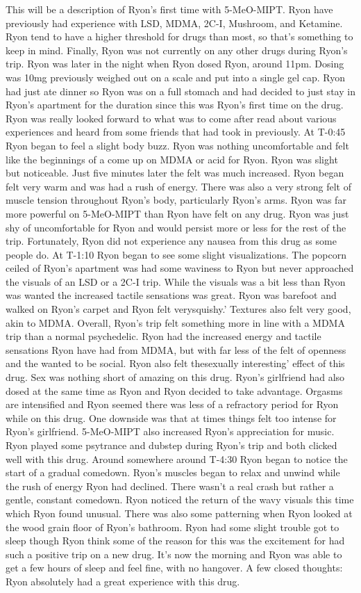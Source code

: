 \documentclass[12pt]{book}
\begin{document}
This will be a description of Ryon's first time with 5-MeO-MIPT. Ryon have previously had experience with LSD, MDMA, 2C-I, Mushroom, and Ketamine. Ryon tend to have a higher threshold for drugs than most, so that's something to keep in mind. Finally, Ryon was not currently on any other drugs during Ryon's trip. Ryon was later in the night when Ryon dosed Ryon, around 11pm. Dosing was 10mg previously weighed out on a scale and put into a single gel cap. Ryon had just ate dinner so Ryon was on a full stomach and had decided to just stay in Ryon's apartment for the duration since this was Ryon's first time on the drug. Ryon was really looked forward to what was to come after read about various experiences and heard from some friends that had took in previously. At T-0:45 Ryon began to feel a slight body buzz. Ryon was nothing uncomfortable and felt like the beginnings of a come up on MDMA or acid for Ryon. Ryon was slight but noticeable. Just five minutes later the felt was much increased. Ryon began felt very warm and was had a rush of energy. There was also a very strong felt of muscle tension throughout Ryon's body, particularly Ryon's arms. Ryon was far more powerful on 5-MeO-MIPT than Ryon have felt on any drug. Ryon was just shy of uncomfortable for Ryon and would persist more or less for the rest of the trip. Fortunately, Ryon did not experience any nausea from this drug as some people do. At T-1:10 Ryon began to see some slight visualizations. The popcorn ceiled of Ryon's apartment was had some waviness to Ryon but never approached the visuals of an LSD or a 2C-I trip. While the visuals was a bit less than Ryon was wanted the increased tactile sensations was great. Ryon was barefoot and walked on Ryon's carpet and Ryon felt verysquishy.' Textures also felt very good, akin to MDMA. Overall, Ryon's trip felt something more in line with a MDMA trip than a normal psychedelic. Ryon had the increased energy and tactile sensations Ryon have had from MDMA, but with far less of the felt of openness and the wanted to be social. Ryon also felt thesexually interesting' effect of this drug. Sex was nothing short of amazing on this drug. Ryon's girlfriend had also dosed at the same time as Ryon and Ryon decided to take advantage. Orgasms are intensified and Ryon seemed there was less of a refractory period for Ryon while on this drug. One downside was that at times things felt too intense for Ryon's girlfriend. 5-MeO-MIPT also increased Ryon's appreciation for music. Ryon played some psytrance and dubstep during Ryon's trip and both clicked well with this drug. Around somewhere around T-4:30 Ryon began to notice the start of a gradual comedown. Ryon's muscles began to relax and unwind while the rush of energy Ryon had declined. There wasn't a real crash but rather a gentle, constant comedown. Ryon noticed the return of the wavy visuals this time which Ryon found unusual. There was also some patterning when Ryon looked at the wood grain floor of Ryon's bathroom. Ryon had some slight trouble got to sleep though Ryon think some of the reason for this was the excitement for had such a positive trip on a new drug. It's now the morning and Ryon was able to get a few hours of sleep and feel fine, with no hangover. A few closed thoughts: Ryon absolutely had a great experience with this drug. 
\end{document}

